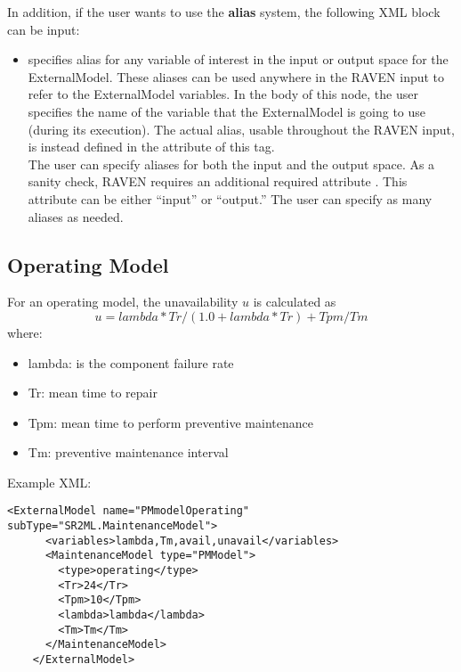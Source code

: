 In addition, if the user wants to use the \textbf{alias} system, the following XML block can be input:
\begin{itemize}
	\item {}  specifies alias for
	any variable of interest in the input or output space for the ExternalModel.
	These aliases can be used anywhere in the RAVEN input to refer to the ExternalModel
	variables.
	In the body of this node, the user specifies the name of the variable that the ExternalModel is
	going to use (during its execution).
	The actual alias, usable throughout the RAVEN input, is instead defined in the
	 attribute of this tag.
	\\The user can specify aliases for both the input and the output space. As a sanity check, RAVEN
	requires an additional required attribute . This attribute can be either ``input'' or ``output.''
	\nb The user can specify as many aliases as needed.
\end{itemize}


\subsection{Operating Model}
For an operating model, the unavailability $u$ is calculated as
\begin{equation}
	u = lambda*Tr/(1.0+lambda*Tr) + Tpm/Tm
\end{equation}
where:
\begin{itemize}
  \item lambda: is the component failure rate
  \item Tr: mean time to repair
  \item Tpm: mean time to perform preventive maintenance
  \item Tm: preventive maintenance interval
\end{itemize}

Example XML:
\begin{lstlisting}[style=XML]
    <ExternalModel name="PMmodelOperating" subType="SR2ML.MaintenanceModel">
      <variables>lambda,Tm,avail,unavail</variables>
      <MaintenanceModel type="PMModel">
        <type>operating</type>
        <Tr>24</Tr>
        <Tpm>10</Tpm>
        <lambda>lambda</lambda>
        <Tm>Tm</Tm>
      </MaintenanceModel>
    </ExternalModel>
\end{lstlisting}

